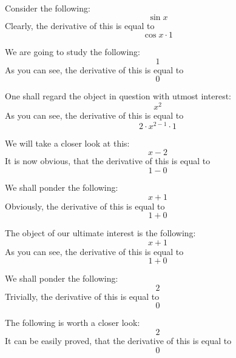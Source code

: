 \documentclass{article}
\begin{document}
Consider the following:
\begin{equation}
\sin x 
\end{equation}
Clearly, the derivative of this is equal to
\begin{equation}
\cos x \cdot 1 
\end{equation}

We are going to study the following:
\begin{equation}
1 
\end{equation}
As you can see, the derivative of this is equal to
\begin{equation}
0 
\end{equation}

One shall regard the object in question with utmost interest:
\begin{equation}
x ^{2 } 
\end{equation}
As you can see, the derivative of this is equal to
\begin{equation}
2 \cdot x ^{2 - 1 } \cdot 1 
\end{equation}

We will take a closer look at this:
\begin{equation}
x - 2 
\end{equation}
It is now obvious, that the derivative of this is equal to
\begin{equation}
1 - 0 
\end{equation}

We shall ponder the following:
\begin{equation}
x + 1 
\end{equation}
Obviously, the derivative of this is equal to
\begin{equation}
1 + 0 
\end{equation}

The object of our ultimate interest is the following:
\begin{equation}
x + 1 
\end{equation}
As you can see, the derivative of this is equal to
\begin{equation}
1 + 0 
\end{equation}

We shall ponder the following:
\begin{equation}
2 
\end{equation}
Trivially, the derivative of this is equal to
\begin{equation}
0 
\end{equation}

The following is worth a closer look:
\begin{equation}
2 
\end{equation}
It can be easily proved, that the derivative of this is equal to
\begin{equation}
0 
\end{equation}
\end{document}
